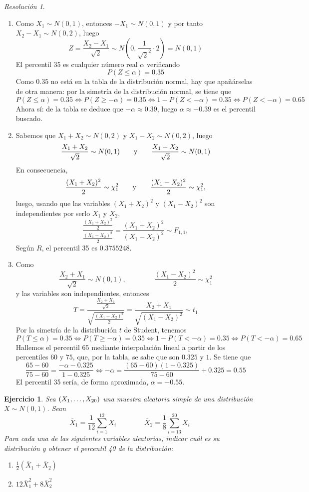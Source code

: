 \documentclass[11pt]{report}
\newtheorem{exercise}{Ejercicio}
\theoremstyle{remark}
\newtheorem*{resolution}{Resolución}
\begin{document}
\begin{resolution}
\hfill
\begin{enumerate}
    \item Como $X_1 \sim N(0,1)$, entonces $-X_1 \sim N(0,1)$ y por tanto $X_2-X_1 \sim N(0,2)$, luego
    \[Z = \frac{X_2-X_1}{\sqrt{2}} \sim N(0,\frac{1}{\sqrt{2}^2} \cdot 2) = N(0,1)\]
    El percentil 35 es cualquier número real $\alpha$ verificando
    \[P(Z \leq \alpha) = 0.35\]
    Como $0.35$ no está en la tabla de la distribución normal, hay que apañárselas de otra manera: por la simetría de la distribución normal, se tiene que
    \[P(Z \leq \alpha) = 0.35 \iff P(Z \geq -\alpha) = 0.35 \iff 1-P(Z < -\alpha) = 0.35 \iff P(Z < -\alpha) = 0.65\]
    Ahora sí: de la tabla se deduce que $-\alpha \approx 0.39$, luego $\alpha \approx -0.39$ es el percentil buscado.
    \item Sabemos que $X_1+X_2 \sim N(0,2)$ y $X_1-X_2 \sim N(0,2)$, luego
    \[\frac{X_1+X_2}{\sqrt{2}} \sim N(0,1) \qquad \textup{y} \qquad \frac{X_1-X_2}{\sqrt{2}} \sim N(0,1)\]
    En consecuencia,
    \[\frac{(X_1+X_2)^2}{2} \sim \chi^2_1 \qquad \textup{y} \qquad \frac{(X_1-X_2)^2}{2} \sim \chi^2_1,\]
    luego, usando que las variables $(X_1+X_2)^2$ y $(X_1-X_2)^2$ son independientes por serlo $X_1$ y $X_2$,
    \[\frac{\frac{(X_1+X_2)^2}{2}}{\frac{(X_1-X_2)^2}{2}} = \frac{(X_1+X_2)^2}{(X_1-X_2)^2} \sim F_{1,1},\]
    Según $R$, el percentil 35 es $0.3755248$.
    \item Como
    \[\frac{X_2+X_1}{\sqrt{2}} \sim N(0,1), \qquad \qquad \frac{(X_1-X_2)^2}{2} \sim \chi^2_1\]
    y las variables son independientes, entonces
    \[T=\frac{\frac{X_2+X_1}{\sqrt{2}}}{\sqrt{\frac{(X_1-X_2)^2}{2}}} = \frac{X_2+X_1}{\sqrt{(X_1-X_2)^2}} \sim t_1\]
    Por la simetría de la distribución $t$ de Student, tenemos
    \[P(T \leq \alpha) = 0.35 \iff P(T \geq -\alpha) = 0.35 \iff 1-P(T < -\alpha) = 0.35 \iff P(T < -\alpha) = 0.65\]
    Hallemos el percentil $65$ mediante interpolación lineal a partir de los percentiles $60$ y $75$, que, por la tabla, se sabe que son $0.325$ y $1$. Se tiene que
    \[\frac{65-60}{75-60} = \frac{-\alpha-0.325}{1-0.325} \iff -\alpha = \frac{(65-60)(1-0.325)}{75-60}+0.325 = 0.55\]
    El percentil 35 sería, de forma aproximada, $\alpha=-0.55$.
\end{enumerate}

\end{resolution}

\begin{exercise}
Sea $(X_1,\mathellipsis,X_{20})$ una muestra aleatoria simple de una distribución $X \sim N(0,1)$. Sean
\[\bar{X}_1=\frac{1}{12}\sum_{i=1}^{12} X_i \qquad \qquad \bar{X}_2=\frac{1}{8}\sum_{i=13}^{20} X_i\]
Para cada una de las siguientes variables aleatorias, indicar cuál es su distribución y obtener el percentil 40 de la distribución:
\begin{enumerate}
    \item $\displaystyle \frac{1}{2}(\bar{X}_1+\bar{X}_2)$
    \item $\displaystyle 12 \bar{X}_1^2+8\bar{X}_2^2$
\end{enumerate}
\end{exercise}
\end{document}
